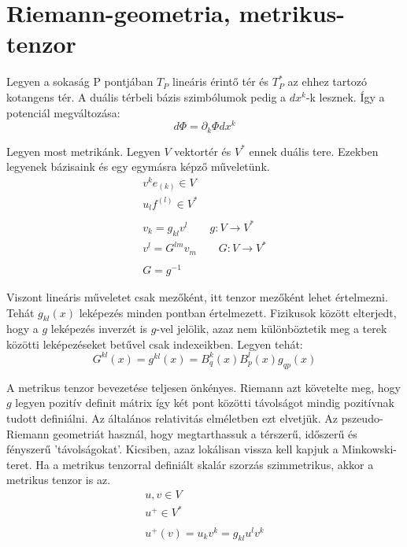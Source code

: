 \documentclass[a4paper, 12pt]{article}
\begin{document}
\section{Riemann-geometria, metrikus-tenzor}
\par Legyen a sokaság P pontjában $T_{P}$ lineáris érintő tér és $T^{*}_{P}$ az ehhez tartozó kotangens tér. A duális térbeli bázis szimbólumok pedig a $dx^{k}$-k lesznek. Így a potenciál megváltozása:
\begin{equation*}
    d\Phi = \partial_k \Phi dx^{k}
\end{equation*}
\par Legyen most metrikánk. Legyen $V$ vektortér és $V^{*}$ ennek duális tere. Ezekben legyenek bázisaink és egy egymásra képző műveletünk. 
\begin{align*}
    v^{k}e_{(k)} \in V \\
    u_{l}f^{(l)} \in V^{*} \\ \\
    v_{k} = g_{kl}v^{l} \quad \quad g : V \rightarrow V^{*} \\
    v^{l} = G^{lm}v_{m} \quad \quad G : V \rightarrow V^{*} \\ \\
    G = g^{-1}
\end{align*}
\par Viszont lineáris műveletet csak mezőként, itt tenzor mezőként lehet értelmezni. Tehát $g_{kl}(x)$ leképezés minden pontban értelmezett. Fizikusok között elterjedt, hogy a $g$ leképezés inverzét is $g$-vel jelölik, azaz nem különböztetik meg a terek közötti leképezéseket betűvel csak indexeikben. Legyen tehát:
\begin{equation*}
    G^{kl}(x) = g^{kl}(x) = B^{k}_{q}(x)B^{l}_{p}(x)g_{qp}(x)
\end{equation*}
\par A metrikus tenzor bevezetése teljesen önkényes. Riemann azt követelte meg, hogy $g$ legyen pozitív definit mátrix így két pont közötti távolságot mindig pozitívnak tudott definiálni. Az általános relativitás elméletben ezt elvetjük. Az pszeudo-Riemann geometriát használ, hogy megtarthassuk a térszerű, időszerű és fényszerű 'távolságokat'. Kicsiben, azaz lokálisan vissza kell kapjuk a Minkowski-teret. Ha a metrikus tenzorral definiált skalár szorzás szimmetrikus, akkor a metrikus tenzor is az.
\begin{gather*}
    u,v \in V \\
    u^{+} \in V^{*} \\ \\
    u^{+}(v) = u_{k}v^{k} = g_{kl}u^{l}v^{k}
\end{gather*}
\end{document}
